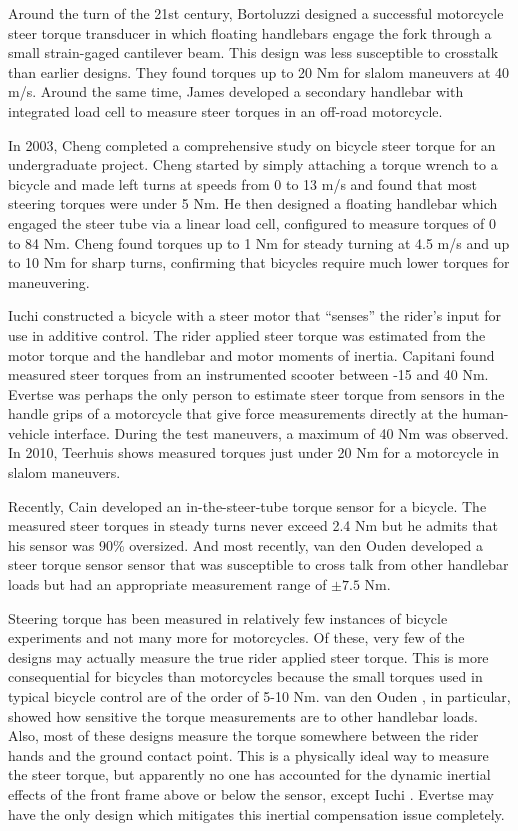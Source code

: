 \documentclass[a4paper]{article}
\begin{document}
Around the turn of the 21st century, Bortoluzzi \cite{Bortoluzzi2000} designed
a successful motorcycle steer torque transducer in which floating handlebars
engage the fork through a small strain-gaged cantilever beam. This design was
less susceptible to crosstalk than earlier designs. They found torques up to
20 Nm for slalom maneuvers at 40 m/s. Around the same time, James
\cite{James2002} developed a secondary handlebar with integrated load cell to
measure steer torques in an off-road motorcycle.

In 2003, Cheng \cite{Cheng2003} completed a comprehensive study on bicycle
steer torque for an undergraduate project. Cheng started by simply attaching a
torque wrench to a bicycle and made left turns at speeds from 0 to 13 m/s and
found that most steering torques were under 5 Nm. He then designed a floating
handlebar which engaged the steer tube via a linear load cell, configured to
measure torques of 0 to 84 Nm. Cheng found torques up to 1 Nm for steady
turning at 4.5 m/s and up to 10 Nm for sharp turns, confirming that bicycles
require much lower torques for maneuvering.

Iuchi \cite{Iuchi2006} constructed a bicycle with a steer motor that ``senses''
the rider's input for use in additive control. The rider applied steer torque
was estimated from the motor torque and the handlebar and motor moments of
inertia. Capitani \cite{Capitani2006} found measured steer torques from an
instrumented scooter between -15 and 40 Nm. Evertse \cite{Evertse2010} was
perhaps the only person to estimate steer torque from sensors in the handle
grips of a motorcycle that give force measurements directly at the
human-vehicle interface. During the test maneuvers, a maximum of 40 Nm was
observed. In 2010, Teerhuis \cite{Teerhuis2010} shows measured torques just
under 20 Nm for a motorcycle in slalom maneuvers.

Recently, Cain \cite{Cain2012} developed an in-the-steer-tube torque sensor for
a bicycle. The measured steer torques in steady turns never exceed 2.4 Nm but
he admits that his sensor was 90\% oversized. And most recently, van den Ouden
\cite{Ouden2011} developed a steer torque sensor sensor that was susceptible to
cross talk from other handlebar loads but had an appropriate measurement range
of $\pm7.5$ Nm.

Steering torque has been measured in relatively few instances of bicycle
experiments and not many more for motorcycles. Of these, very few of the
designs may actually measure the true rider applied steer torque. This is more
consequential for bicycles than motorcycles because the small torques used in
typical bicycle control are of the order of 5-10 Nm. van den Ouden
\cite{Ouden2011}, in particular, showed how sensitive the torque measurements
are to other handlebar loads. Also, most of these designs measure the torque
somewhere between the rider hands and the ground contact point. This is a
physically ideal way to measure the steer torque, but apparently no one has
accounted for the dynamic inertial effects of the front frame above or below
the sensor, except Iuchi \cite{Iuchi2006}. Evertse \cite{Evertse2010} may
have the only design which mitigates this inertial compensation issue
completely.
\end{document}

